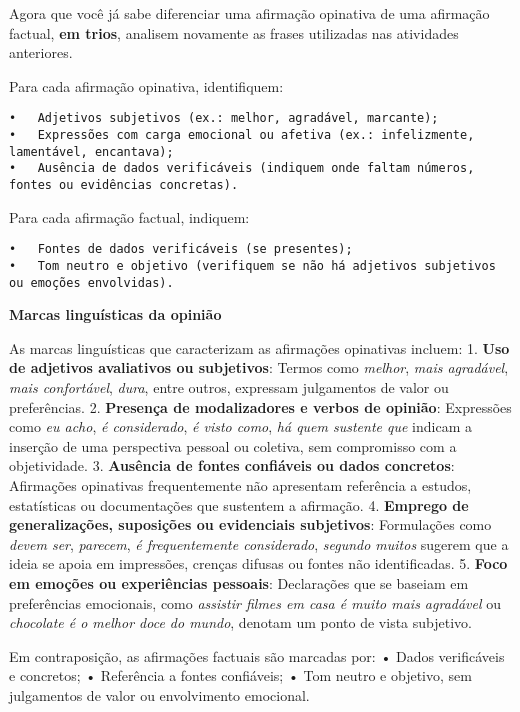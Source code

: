 \documentclass[
  letterpaper,
  DIV=11,
  numbers=noendperiod]{scrreprt}
\begin{document}
Agora que você já sabe diferenciar uma afirmação opinativa de uma
afirmação factual, \textbf{em trios}, analisem novamente as frases
utilizadas nas atividades anteriores.

Para cada afirmação opinativa, identifiquem:

\begin{verbatim}
•   Adjetivos subjetivos (ex.: melhor, agradável, marcante);
•   Expressões com carga emocional ou afetiva (ex.: infelizmente, lamentável, encantava);
•   Ausência de dados verificáveis (indiquem onde faltam números, fontes ou evidências concretas).
\end{verbatim}

Para cada afirmação factual, indiquem:

\begin{verbatim}
•   Fontes de dados verificáveis (se presentes);
•   Tom neutro e objetivo (verifiquem se não há adjetivos subjetivos ou emoções envolvidas).
\end{verbatim}

\textbf{Marcas linguísticas da opinião}

As marcas linguísticas que caracterizam as afirmações opinativas
incluem: 1. \textbf{Uso de adjetivos avaliativos ou subjetivos}: Termos
como \emph{melhor}, \emph{mais agradável}, \emph{mais confortável},
\emph{dura}, entre outros, expressam julgamentos de valor ou
preferências. 2. \textbf{Presença de modalizadores e verbos de opinião}:
Expressões como \emph{eu acho}, \emph{é considerado}, \emph{é visto
como}, \emph{há quem sustente que} indicam a inserção de uma perspectiva
pessoal ou coletiva, sem compromisso com a objetividade. 3.
\textbf{Ausência de fontes confiáveis ou dados concretos}: Afirmações
opinativas frequentemente não apresentam referência a estudos,
estatísticas ou documentações que sustentem a afirmação. 4.
\textbf{Emprego de generalizações, suposições ou evidenciais
subjetivos}: Formulações como \emph{devem ser}, \emph{parecem}, \emph{é
frequentemente considerado}, \emph{segundo muitos} sugerem que a ideia
se apoia em impressões, crenças difusas ou fontes não identificadas. 5.
\textbf{Foco em emoções ou experiências pessoais}: Declarações que se
baseiam em preferências emocionais, como \emph{assistir filmes em casa é
muito mais agradável} ou \emph{chocolate é o melhor doce do mundo},
denotam um ponto de vista subjetivo.

Em contraposição, as afirmações factuais são marcadas por: • Dados
verificáveis e concretos; • Referência a fontes confiáveis; • Tom neutro
e objetivo, sem julgamentos de valor ou envolvimento emocional.
\end{document}
